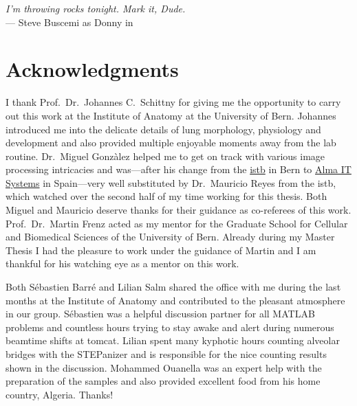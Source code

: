 \acresetall
{}
\begin{flushright}{\slshape I'm throwing rocks tonight. Mark it, Dude.} \\ \medskip
    --- Steve Buscemi as Donny in \citep{TheBigLebowski}
\end{flushright}
\vspace{6cm}

\begingroup
\let\clearpage\relax
\let\cleardoublepage\relax
\let\cleardoublepage\relax
\chapter*{Acknowledgments}
I thank Prof.\ Dr.\ Johannes C.\ Schittny for giving me the opportunity to carry out this work at the Institute of Anatomy at the University of Bern. Johannes introduced me into the delicate details of lung morphology, physiology and development and also provided multiple enjoyable moments away from the lab routine. Dr.\ Miguel Gonzàlez helped me to get on track with various image processing intricacies and was---after his  change from the \href{http://www.istb.unibe.ch/}{\ac{istb}} in Bern to \href{http://www.alma3d.com/en}{Alma IT Systems} in Spain---very well substituted by Dr.\ Mauricio Reyes from the \ac{istb}, which watched over the second half of my time working for this thesis. Both Miguel and Mauricio deserve thanks for their guidance as co-referees of this work. Prof.\ Dr.\ Martin Frenz acted as my mentor for the Graduate School for Cellular and Biomedical Sciences of the University of Bern. Already during my Master Thesis I had the pleasure to work under the guidance of  Martin and I am thankful for his watching eye as a mentor on this work.

Both Sébastien Barré and Lilian Salm shared the office with me during the last months at the Institute of Anatomy and contributed to the pleasant atmosphere in our group. Sébastien was a helpful discussion partner for all MATLAB problems and countless hours trying to stay awake and alert during numerous beamtime shifts at \acs{tomcat}. Lilian spent many kyphotic hours counting alveolar bridges with the STEPanizer and is responsible for the nice counting results shown in the discussion. Mohammed Ouanella was an expert help with the preparation of the samples and also provided excellent food from his home country, Algeria. Thanks!

